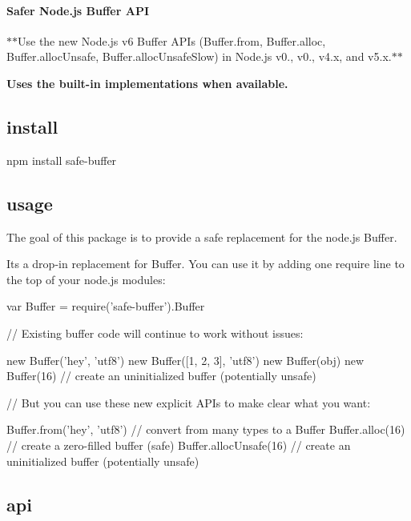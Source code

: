 \paragraph*{Safer Node.\+js Buffer A\+PI}

$\ast$$\ast$\+Use the new Node.\+js v6 Buffer A\+P\+Is ({\ttfamily Buffer.\+from}, {\ttfamily Buffer.\+alloc}, {\ttfamily Buffer.\+alloc\+Unsafe}, {\ttfamily Buffer.\+alloc\+Unsafe\+Slow}) in Node.\+js v0., v0., v4.\+x, and v5.\+x.$\ast$$\ast$

{\bfseries Uses the built-\/in implementations when available.}

\subsection*{install}


\begin{DoxyCode}
npm install safe-buffer
\end{DoxyCode}


\subsection*{usage}

The goal of this package is to provide a safe replacement for the node.\+js {\ttfamily Buffer}.

It\textquotesingle{}s a drop-\/in replacement for {\ttfamily Buffer}. You can use it by adding one {\ttfamily require} line to the top of your node.\+js modules\+:


\begin{DoxyCode}
var Buffer = require('safe-buffer').Buffer

// Existing buffer code will continue to work without issues:

new Buffer('hey', 'utf8')
new Buffer([1, 2, 3], 'utf8')
new Buffer(obj)
new Buffer(16) // create an uninitialized buffer (potentially unsafe)

// But you can use these new explicit APIs to make clear what you want:

Buffer.from('hey', 'utf8') // convert from many types to a Buffer
Buffer.alloc(16) // create a zero-filled buffer (safe)
Buffer.allocUnsafe(16) // create an uninitialized buffer (potentially unsafe)
\end{DoxyCode}


\subsection*{api}

